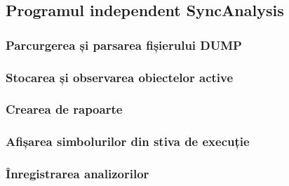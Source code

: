 \subsection{Programul independent SyncAnalysis}
\label{executable}

\subsubsection{Parcurgerea și parsarea fișierului DUMP}

\subsubsection{Stocarea și observarea obiectelor active}

\subsubsection{Crearea de rapoarte}

\subsubsection{Afișarea simbolurilor din stiva de execuție}
\label{stack-reconstruction}

\subsubsection{Înregistrarea analizorilor}
